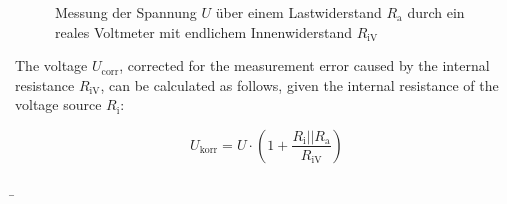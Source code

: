 \begin{frame}
{		\begin{figure}[h!]
			\renewcommand{\figurename}{Figure}
		\begin{center}
			




		\end{center}
		\label{fig:voltmeterreal}
		\caption{Messung der Spannung $U$ über einem Lastwiderstand $R_\mathrm{a}$ durch ein reales
		 Voltmeter mit endlichem Innenwiderstand $R_\mathrm{iV}$}
		
	\end{figure}

	The voltage $U_\mathrm{corr}$, corrected for the measurement error caused by the internal resistance $R_\mathrm{iV}$,
    can be calculated as follows, given the internal resistance of the voltage source
    $R_\mathrm{i}$:

	 \begin{equation*}
		U_{\mathrm{korr}}= U\cdot\left(1+\frac{R_{\mathrm{i}}||R_{\mathrm{a}}}{R_{\mathrm{iV}}}\right)
	\end{equation*}

	}

	\b{


}
\end{frame}
